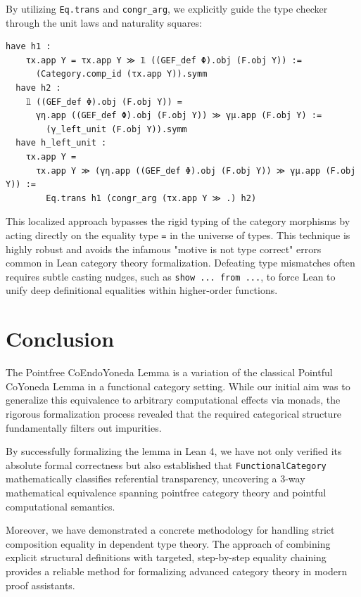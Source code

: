 \documentclass{article}
\begin{document}
By utilizing \texttt{Eq.trans} and \texttt{congr\_arg}, we explicitly guide the type checker
through the unit laws and naturality squares:

\begin{lstlisting}[basicstyle=\tiny]
  have h1 : 
    τx.app Y = τx.app Y ≫ 𝟙 ((GEF_def Φ).obj (F.obj Y)) := 
      (Category.comp_id (τx.app Y)).symm
  have h2 : 
    𝟙 ((GEF_def Φ).obj (F.obj Y)) = 
      γη.app ((GEF_def Φ).obj (F.obj Y)) ≫ γμ.app (F.obj Y) :=
        (γ_left_unit (F.obj Y)).symm
  have h_left_unit : 
    τx.app Y = 
      τx.app Y ≫ (γη.app ((GEF_def Φ).obj (F.obj Y)) ≫ γμ.app (F.obj Y)) :=
        Eq.trans h1 (congr_arg (τx.app Y ≫ .) h2)
\end{lstlisting}
\vspace{6pt}

This localized approach bypasses the rigid typing of the category morphisms by
acting directly on the equality type \texttt{=} in the universe of types. This technique is highly
robust and avoids the infamous "motive is not type correct" errors common in Lean category theory
formalization. Defeating type mismatches often requires subtle casting nudges, such as
\texttt{show ... from ...}, to force Lean to unify deep definitional equalities within higher-order
functions.

\section{Conclusion}

The Pointfree CoEndoYoneda Lemma is a variation of the classical Pointful CoYoneda Lemma in a
functional category setting. While our initial aim was to generalize this equivalence to arbitrary
computational effects via monads, the rigorous formalization process revealed that the required
categorical structure fundamentally filters out impurities.

By successfully formalizing the lemma in Lean 4, we have not only verified its absolute formal
correctness but also established that \texttt{FunctionalCategory} mathematically classifies
referential transparency, uncovering a 3-way mathematical equivalence spanning pointfree category
theory and pointful computational semantics. 

Moreover, we have demonstrated a concrete methodology for handling strict
composition equality in dependent type theory. The approach of combining explicit structural
definitions with targeted, step-by-step equality chaining provides a reliable method for
formalizing advanced category theory in modern proof assistants.
\end{document}
